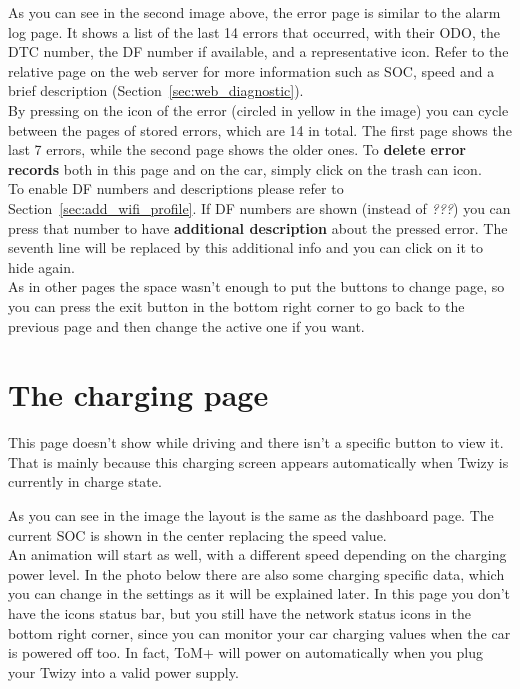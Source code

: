 As you can see in the second image above, the error page is similar to the alarm log page. 
It shows a list of the last 14 errors that occurred, with their ODO, the DTC number,
the DF number if available, and a representative icon. Refer to the relative page on
the web server for more information such as SOC, speed and a brief description (Section~\ref{sec:web_diagnostic}).\\

By pressing on the icon of the error (circled in yellow in the image) you can cycle between the pages of stored errors,
which are 14 in total. The first page shows the last 7 errors, while the second page shows the older ones.
To \textbf{delete error records} both in this page and on the car, simply click on the trash can icon.\\

To enable DF numbers and descriptions please refer to Section~\ref{sec:add_wifi_profile}.
If DF numbers are shown (instead of \textit{???}) you can press that number to
have \textbf{additional description} about the pressed error. The seventh line will be
replaced by this additional info and you can click on it to hide again.\\

As in other pages the space wasn't enough to put the buttons to change page, so you can press
the exit button in the bottom right corner to go back to the previous page and then change the active one if you want.

\clearpage

\section{The charging page}
\label{sec:charging_page}

This page doesn't show while driving and there isn't a specific button to view it. That
is mainly because this charging screen appears automatically when Twizy is currently
in charge state. 

As you can see in the image the layout is the same as the dashboard page. The current
SOC is shown in the center replacing the speed value.\\

An animation will start as well, with a different speed depending on the charging power level.
In the photo below there are also some charging specific data, which you can change in the settings
as it will be explained later. In this page you don't have the icons status bar, but you still
have the network status icons in the bottom right corner, since you can monitor your car charging
values when the car is powered off too. In fact, ToM+ will power on automatically when you plug your
Twizy into a valid power supply.

